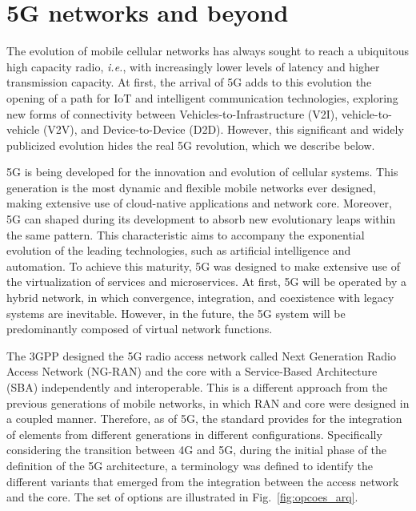 \section{5G networks and beyond}
\label{sec:5G}

The evolution of mobile cellular networks has always sought to reach a ubiquitous high capacity radio, \textit{i.e.}, with increasingly lower levels of latency and higher transmission capacity. At first, the arrival of 5G adds to this evolution the opening of a path for IoT and intelligent communication technologies, exploring new forms of connectivity between Vehicles-to-Infrastructure (V2I), vehicle-to-vehicle (V2V), and Device-to-Device (D2D). However, this significant and widely publicized evolution hides the real 5G revolution, which we describe below.

5G is being developed for the innovation and evolution of cellular systems. This generation is the most dynamic and flexible mobile networks ever designed, making extensive use of cloud-native applications and network core. Moreover, 5G can shaped during its development to absorb new evolutionary leaps within the same pattern. This characteristic aims to accompany the exponential evolution of the leading technologies, such as artificial intelligence and automation. To achieve this maturity, 5G was designed to make extensive use of the virtualization of services and microservices. At first, 5G will be operated by a hybrid network, in which convergence, integration, and coexistence with legacy systems are inevitable. However, in the future, the 5G system will be predominantly composed of virtual network functions.

The 3GPP designed the 5G radio access network called Next Generation Radio Access Network (NG-RAN) and the core with a Service-Based Architecture (SBA) independently and interoperable. This is a different approach from the previous generations of mobile networks, in which RAN and core were designed in a coupled manner. Therefore, as of 5G, the standard provides for the integration of elements from different generations in different configurations. Specifically considering the transition between 4G and 5G, during the initial phase of the definition of the 5G architecture, a terminology was defined to identify the different variants that emerged from the integration between the access network and the core. The set of options are illustrated in Fig.~\ref{fig:opcoes_arq}.

